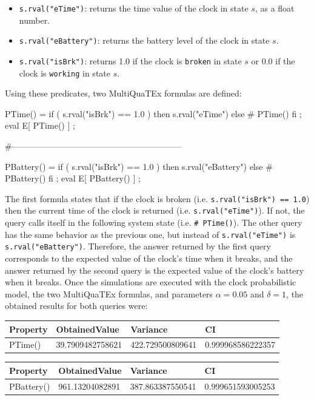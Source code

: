 \begin{itemize}
    \item \texttt{s.rval("eTime")}: returns the time value of the clock in state $s$, as a float number.
    \item \texttt{s.rval("eBattery")}: returns the battery level of the clock in state $s$.
    \item \texttt{s.rval("isBrk")}: returns 1.0 if the clock is \texttt{broken} in state $s$ or 0.0 if the clock is \texttt{working} in state $s$.
\end{itemize}
Using these predicates, two MultiQuaTEx formulas are defined:
\\
\begin{maude2}
PTime() = if ( s.rval("isBrk") == 1.0 ) 
          then s.rval("eTime") else # PTime() fi ;
eval E[ PTime() ] ;

#------------------------------------------------------------

PBattery() = if ( s.rval("isBrk") == 1.0 ) 
             then s.rval("eBattery") else # PBattery() fi ;
eval E[ PBattery() ] ;
\end{maude2}
The first formula states that if the clock is broken (i.e. \texttt{s.rval("isBrk") == 1.0}) then the current time of the clock is returned (i.e. \texttt{s.rval("eTime")}). If not, the query calls itself in the following system state (i.e. \texttt{\# PTime()}). The other query has the same behavior as the previous one, but instead of \texttt{s.rval("eTime")} is \texttt{s.rval("eBattery")}. Therefore, the answer returned by the first query corresponds to the expected value of the clock's time when it breaks, and the answer returned by the second query is the expected value of the clock's battery when it breaks. Once the simulations are executed with the clock probabilistic model, the two MultiQuaTEx formulas, and parameters $\alpha = 0.05$ and $\delta = 1$, the obtained results for both queries were:
\begin{table}[H]
\centering
\begin{tabular}{|l|l|l|l|}
\hline
Property & ObtainedValue    & Variance         & CI                 \\ \hline
PTime()  & 39.7909482758621 & 422.729500809641 & 0.999968586222357         \\ \hline
\end{tabular}
\end{table}
\begin{table}[H]
\centering
\begin{tabular}{|l|l|l|l|}
\hline
Property   & ObtainedValue   & Variance         & CI                 \\ \hline
PBattery() & 961.13204082891 & 387.863387550541 & 0.999651593005253 \\ \hline
\end{tabular}
\end{table}

